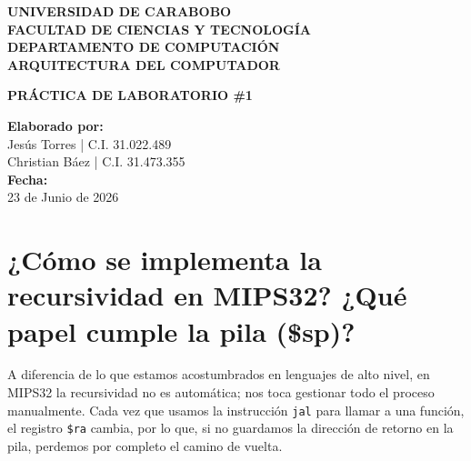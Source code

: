 \documentclass[12pt,letterpaper]{article}
\begin{document}
\begin{titlepage}
    \begin{center}
        {\large \textbf{UNIVERSIDAD DE CARABOBO}} \\
        {\large \textbf{FACULTAD DE CIENCIAS Y TECNOLOGÍA}} \\
        {\large \textbf{DEPARTAMENTO DE COMPUTACIÓN}} \\
        {\large \textbf{ARQUITECTURA DEL COMPUTADOR}} \\
        
        \vspace{4.5cm}
        
        {\LARGE \textbf{PRÁCTICA DE LABORATORIO \#1}} \\
        
        \vspace{5.5cm}
        
        \begin{flushright}
            \textbf{Elaborado por:} \\
            Jesús Torres | C.I. 31.022.489 \\
            Christian Báez | C.I. 31.473.355 \\
            \vspace{1cm}
            \textbf{Fecha:} \\
            23 de Junio de 2026
        \end{flushright}
        
    \end{center}
\end{titlepage}

\newpage

\tableofcontents
\newpage


\section{¿Cómo se implementa la recursividad en MIPS32? ¿Qué papel cumple la pila (\$sp)?}
A diferencia de lo que estamos acostumbrados en lenguajes de alto nivel, en MIPS32 la recursividad no es automática; nos toca gestionar todo el proceso manualmente. Cada vez que usamos la instrucción \texttt{jal} para llamar a una función, el registro \texttt{\$ra} cambia, por lo que, si no guardamos la dirección de retorno en la pila, perdemos por completo el camino de vuelta.
\end{document}
